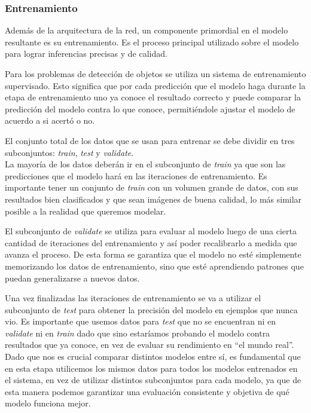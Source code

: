 \documentclass[a4paper]{article}
\begin{document}
\subsubsection{Entrenamiento}

Además de la arquitectura de la red, un componente primordial en el modelo resultante es su entrenamiento. Es el proceso principal utilizado sobre el modelo para lograr inferencias precisas y de calidad.

Para los problemas de detección de objetos se utiliza un sistema de entrenamiento supervisado. Esto significa que por cada predicción que el modelo haga durante la etapa de entrenamiento uno ya conoce el resultado correcto y puede comparar la predicción del modelo contra lo que conoce, permitiéndole ajustar el modelo de acuerdo a si acertó o no.

El conjunto total de los datos que se usan para entrenar se debe dividir en tres subconjuntos: \textit{train}, \textit{test} y \textit{validate}.\\

La mayoría de los datos deberán ir en el subconjunto de \textit{train} ya que son las predicciones que el modelo hará en las iteraciones de entrenamiento. Es importante tener un conjunto de \textit{train} con un volumen grande de datos, con sus resultados bien clasificados y que sean imágenes de buena calidad, lo más similar posible a la realidad que queremos modelar.

El subconjunto de \textit{validate} se utiliza para evaluar al modelo luego de una cierta cantidad de iteraciones del entrenamiento y así poder recalibrarlo a medida que avanza el proceso. De esta forma se garantiza que el modelo no esté simplemente memorizando los datos de entrenamiento, sino que esté aprendiendo patrones que puedan generalizarse a nuevos datos.

Una vez finalizadas las iteraciones de entrenamiento se va a utilizar el subconjunto de \textit{test} para obtener la precisión del modelo en ejemplos que nunca vio. Es importante que usemos datos para \textit{test} que no se encuentran ni en \textit{validate} ni en \textit{train} dado que sino estaríamos probando el modelo contra resultados que ya conoce, en vez de evaluar su rendimiento en ``el mundo real''. Dado que nos es crucial comparar distintos modelos entre sí, es fundamental que en esta etapa utilicemos los mismos datos para todos los modelos entrenados en el sistema, en vez de utilizar distintos subconjuntos para cada modelo, ya que de esta manera podemos garantizar una evaluación consistente y objetiva de qué modelo funciona mejor.\\
\end{document}

